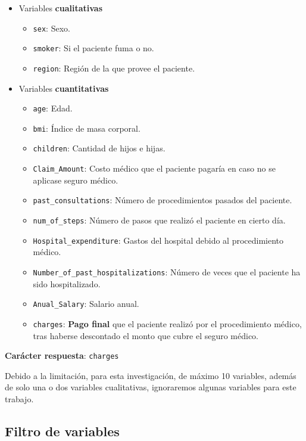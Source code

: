 \documentclass[
  letterpaper,
  DIV=11,
  numbers=noendperiod]{scrartcl}
\providecommand{\tightlist}{%
  \setlength{\itemsep}{0pt}\setlength{\parskip}{0pt}}\usepackage{longtable,booktabs,array}
\begin{document}
\begin{itemize}
\tightlist
\item
  Variables \textbf{cualitativas}

  \begin{itemize}
  \tightlist
  \item
    \texttt{sex}: Sexo.
  \item
    \texttt{smoker}: Si el paciente fuma o no.
  \item
    \texttt{region}: Región de la que provee el paciente.
  \end{itemize}
\item
  Variables \textbf{cuantitativas}

  \begin{itemize}
  \tightlist
  \item
    \texttt{age}: Edad.
  \item
    \texttt{bmi}: Índice de masa corporal.
  \item
    \texttt{children}: Cantidad de hijos e hijas.
  \item
    \texttt{Claim\_Amount}: Costo médico que el paciente pagaría en caso
    no se aplicase seguro médico.
  \item
    \texttt{past\_consultations}: Número de procedimientos pasados del
    paciente.
  \item
    \texttt{num\_of\_steps}: Número de pasos que realizó el paciente en
    cierto día.
  \item
    \texttt{Hospital\_expenditure}: Gastos del hospital debido al
    procedimiento médico.
  \item
    \texttt{Number\_of\_past\_hospitalizations}: Número de veces que el
    paciente ha sido hospitalizado.
  \item
    \texttt{Anual\_Salary}: Salario anual.
  \item
    \texttt{charges}: \textbf{Pago final} que el paciente realizó por el
    procedimiento médico, tras haberse descontado el monto que cubre el
    seguro médico.
  \end{itemize}
\end{itemize}

\textbf{Carácter respuesta}: \texttt{charges}

Debido a la limitación, para esta investigación, de máximo 10 variables,
además de solo una o dos variables cualitativas, ignoraremos algunas
variables para este trabajo.

\subsection{Filtro de variables}\label{filtro-de-variables}
\end{document}
